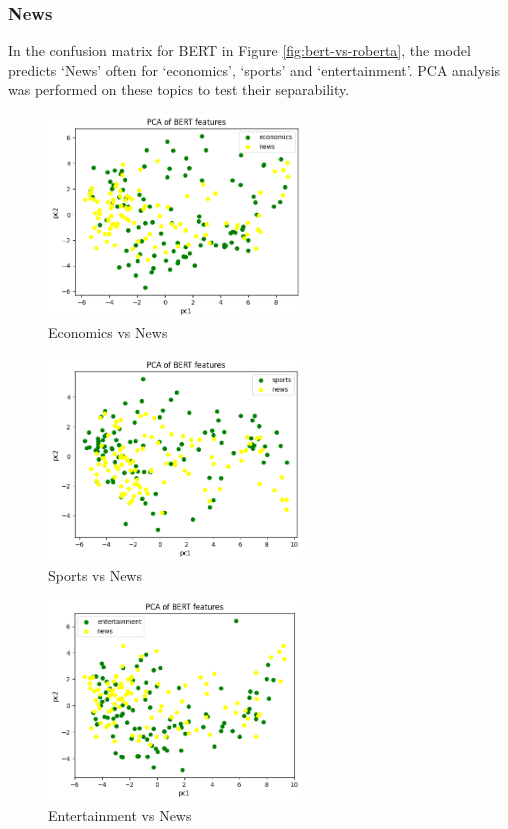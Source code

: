 \subsubsection{News}
In the confusion matrix for BERT in Figure \ref{fig:bert-vs-roberta}, the model predicts `News' often for `economics', `sports' and `entertainment'.
PCA analysis was performed on these topics to test their separability.
\begin{figure}
    \centering
    \includegraphics[width=0.6\textwidth]{../images/econ-news.png}
    \caption{Economics vs News}
    \label{fig:econ-news}
\end{figure} 
\begin{figure}
    \centering
    \includegraphics[width=0.6\textwidth]{../images/sport-news.png}
    \caption{Sports vs News}
    \label{fig:sport-news}
\end{figure} 
\begin{figure}
    \centering
    \includegraphics[width=0.6\textwidth]{../images/ent-news.png}
    \caption{Entertainment vs News}
    \label{fig:ent-news}
\end{figure} 

